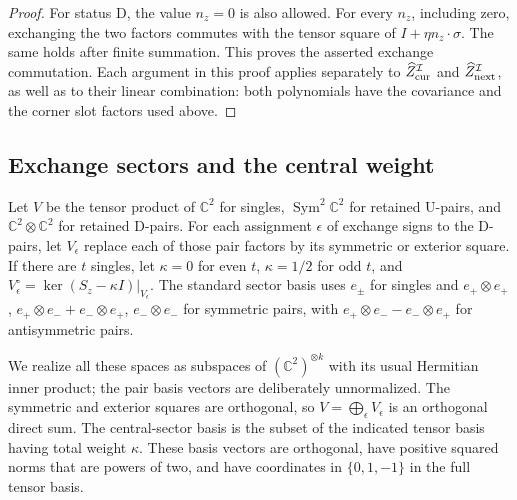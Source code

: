 \begin{proof}
For status \(\mathrm D\), the value \(n_z=0\) is also allowed.
For every \(n_z\), including zero, exchanging the two factors
commutes with the tensor square of \(I+\eta n_z\cdot\sigma\).
The same holds after finite summation.  This proves the asserted
exchange commutation.  Each argument in this proof applies
separately to \(\widehat Z_{\rm cur}^{\mathcal I}\) and
\(\widehat Z_{\rm next}^{\mathcal I}\), as well as to their
linear combination: both polynomials have the covariance and
the corner slot factors used above.
\end{proof}

\subsection{Exchange sectors and the central weight}

\begin{definition}\label{d:exchange}
Let \(V\) be the tensor product of \(\mathbb C^2\) for singles,
\(\operatorname{Sym}^2\mathbb C^2\) for retained \(\mathrm U\)-pairs,
and \(\mathbb C^2\otimes\mathbb C^2\) for retained \(\mathrm D\)-pairs.
For each assignment \(\epsilon\) of exchange signs to the
\(\mathrm D\)-pairs, let \(V_\epsilon\) replace each of those
pair factors by its symmetric or exterior square.
If there are \(t\) singles, let \(\kappa=0\) for even \(t\),
\(\kappa=1/2\) for odd \(t\), and
\(V_\epsilon^\circ=\ker(S_z-\kappa I)|_{V_\epsilon}\).
The standard sector basis uses \(e_\pm\) for singles and
\(e_+\otimes e_+\), \(e_+\otimes e_-+e_-\otimes e_+\),
\(e_-\otimes e_-\) for symmetric pairs, with
\(e_+\otimes e_--e_-\otimes e_+\) for antisymmetric pairs.
\end{definition}

We realize all these spaces as subspaces of
\((\mathbb C^2)^{\otimes k}\) with its usual Hermitian inner
product; the pair basis vectors are deliberately unnormalized.
The symmetric and exterior squares are orthogonal, so
\(V=\bigoplus_\epsilon V_\epsilon\) is an orthogonal direct sum.
The central-sector basis is the subset of the indicated tensor
basis having total weight \(\kappa\).  These basis vectors are
orthogonal, have positive squared norms that are powers of two,
and have coordinates in \(\{0,1,-1\}\) in the full tensor basis.

